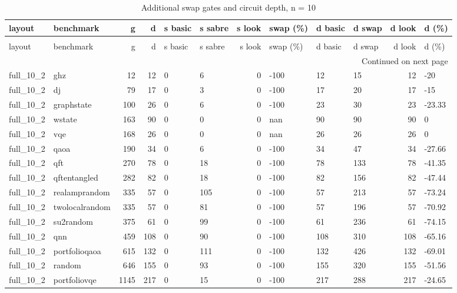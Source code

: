\begin{longtable}{llrrllrlllrl}
\caption{Additional swap gates and circuit depth, n = 10} \label{benchmark-table-10} \\
\toprule
layout & benchmark & g & d & s basic & s sabre & s look & swap (\%) & d basic & d swap & d look & d (\%) \\
\midrule
\endfirsthead
\caption[]{Additional swap gates and circuit depth, n = 10} \\
\toprule
layout & benchmark & g & d & s basic & s sabre & s look & swap (\%) & d basic & d swap & d look & d (\%) \\
\midrule
\endhead
\midrule
\multicolumn{12}{r}{Continued on next page} \\
\midrule
\endfoot
\bottomrule
\endlastfoot
full\_10\_2 & ghz & 12 & 12 & 0 & 6 & 0 & -100 & 12 & 15 & 12 & -20 \\
full\_10\_2 & dj & 79 & 17 & 0 & 3 & 0 & -100 & 17 & 20 & 17 & -15 \\
full\_10\_2 & graphstate & 100 & 26 & 0 & 6 & 0 & -100 & 23 & 30 & 23 & -23.33 \\
full\_10\_2 & wstate & 163 & 90 & 0 & 0 & 0 & nan & 90 & 90 & 90 & 0 \\
full\_10\_2 & vqe & 168 & 26 & 0 & 0 & 0 & nan & 26 & 26 & 26 & 0 \\
full\_10\_2 & qaoa & 190 & 34 & 0 & 6 & 0 & -100 & 34 & 47 & 34 & -27.66 \\
full\_10\_2 & qft & 270 & 78 & 0 & 18 & 0 & -100 & 78 & 133 & 78 & -41.35 \\
full\_10\_2 & qftentangled & 282 & 82 & 0 & 18 & 0 & -100 & 82 & 156 & 82 & -47.44 \\
full\_10\_2 & realamprandom & 335 & 57 & 0 & 105 & 0 & -100 & 57 & 213 & 57 & -73.24 \\
full\_10\_2 & twolocalrandom & 335 & 57 & 0 & 81 & 0 & -100 & 57 & 196 & 57 & -70.92 \\
full\_10\_2 & su2random & 375 & 61 & 0 & 99 & 0 & -100 & 61 & 236 & 61 & -74.15 \\
full\_10\_2 & qnn & 459 & 108 & 0 & 90 & 0 & -100 & 108 & 310 & 108 & -65.16 \\
full\_10\_2 & portfolioqaoa & 615 & 132 & 0 & 111 & 0 & -100 & 132 & 426 & 132 & -69.01 \\
full\_10\_2 & random & 646 & 155 & 0 & 93 & 0 & -100 & 155 & 320 & 155 & -51.56 \\
full\_10\_2 & portfoliovqe & 1145 & 217 & 0 & 15 & 0 & -100 & 217 & 288 & 217 & -24.65 \\

\end{longtable}
